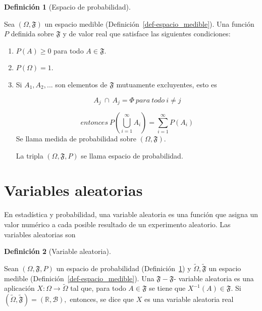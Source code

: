 \documentclass[
  us-letterpaper,
]{scrreprt}
\theoremstyle{definition}
\newtheorem{definition}{Definición}[chapter]
\theoremstyle{plain}
\theoremstyle{plain}
\theoremstyle{remark}
\begin{document}
\begin{definition}[Espacio de
probabilidad]\protect\hypertarget{def-espacio_probabilidad}{}\label{def-espacio_probabilidad}

Sea \((\Omega, \mathfrak{F})\) un espacio medible
(Definición~\ref{def-espacio_medible}). Una función \(P\) definida sobre
\(\mathfrak{F}\) y de valor real que satisface las siguientes
condiciones:

\begin{enumerate}
\def\labelenumi{\roman{enumi}.}
\item
  \(P(A) \geq 0\) para todo \(A \in \mathfrak{F}\).
\item
  \(P(\Omega) = 1\).
\item
  Si \(A_1, A_2, ...\) son elementos de \(\mathfrak{F}\) mutuamente
  excluyentes, esto es

  \[
  A_j \ \cap \ A_j = \Phi \ para \  todo \ i \neq j 
  \]

  \[
  entonces \ P \left( \bigcup_{i=1}^{\infty} A_i\right) = \sum_{i=1}^{\infty} P(A_i)
  \]Se llama medida de probabilidad sobre \((\Omega, \mathfrak{F})\).

  La tripla \((\Omega, \mathfrak{F}, P)\) se llama espacio de
  probabilidad.
\end{enumerate}

\end{definition}

\section{Variables aleatorias}\label{variables-aleatorias}

En estadística y probabilidad, una variable aleatoria es una función que
asigna un valor numérico a cada posible resultado de un experimento
aleatorio. Las variables aleatorias son

\begin{definition}[Variable
aleatoria]\protect\hypertarget{def-variable_aleatoria}{}\label{def-variable_aleatoria}

Sean \((\Omega,\mathfrak{F}, P)\) un espacio de probabilidad
(Definición~\ref{def-espacio_probabilidad}) y
\(\tilde{\Omega},\tilde{\mathfrak{F}}\) un espacio medible
(Definición~\ref{def-espacio_medible}). Una
\(\mathfrak{F}-\mathfrak{F}\)- variable aleatoria es una aplicación
\(X:\Omega\rightarrow \tilde{\Omega}\) tal que, para todo
\(A \in \mathfrak{F}\) se tiene que \(X^{-1}(A) \in  \mathfrak{F}\). Si
\((\tilde{\Omega}, \tilde{\mathfrak{F}}) = (\mathbb{R},\mathcal{B}),\)
entonces, se dice que \(X\) es una variable aleatoria real

\end{definition}
\end{document}
